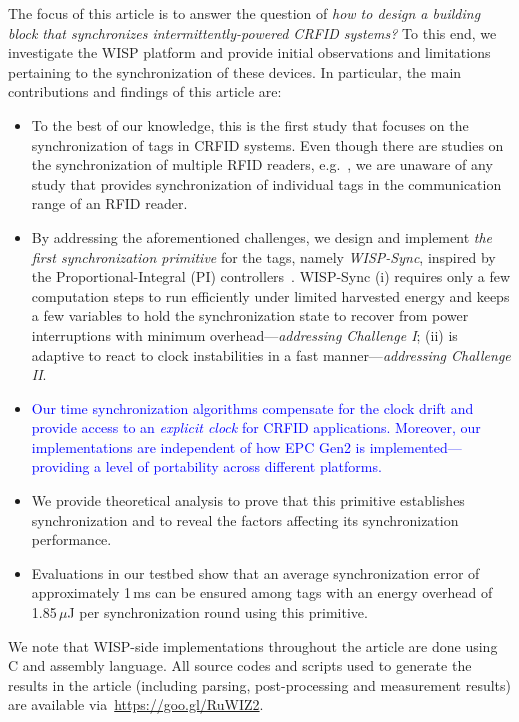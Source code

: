 \documentclass[10pt,journal,compsoc]{IEEEtran}
\newcommand{\add}[1]{\textcolor{blue}{#1}}
\begin{document}
The focus of this article is to answer the question of \emph{how to design a building block that synchronizes intermittently-powered CRFID systems?} To this end, we investigate the WISP platform and provide initial observations and limitations pertaining to the synchronization of these devices. In particular, the main contributions and findings of 
this article are:
%
\begin{itemize}
	\item To the best of our knowledge, this is the first study that focuses on the synchronization of tags in CRFID systems. Even though there are studies on the synchronization of multiple RFID readers, e.g.~\cite{reader_sync}, we are unaware of any study that provides synchronization of individual tags in the communication range of an RFID reader. 
	\item By addressing the aforementioned challenges, we design and implement \emph{the first synchronization primitive} for the tags, namely \emph{WISP-Sync}, inspired by the Proportional-Integral (PI) controllers~\cite{pi2015,yildirim2017adaptive}. WISP-Sync (i) 
	requires only a few computation steps to run efficiently under limited harvested energy and keeps a few variables to hold the synchronization state to recover from power interruptions with minimum overhead---\emph{addressing Challenge I}; (ii) is adaptive to react to clock instabilities in a fast manner---\emph{addressing Challenge II}.
	\item \add{Our time synchronization algorithms compensate for the clock drift and provide access to an \emph{explicit clock} for CRFID applications. Moreover, our implementations are independent of how EPC Gen2 is implemented---providing a level of portability across different platforms.}
	\item We provide theoretical analysis to prove that this primitive establishes synchronization and to reveal the factors affecting its synchronization performance.
	\item Evaluations in our testbed show that an average synchronization error of approximately 1\,ms can be ensured among tags with an energy overhead of 1.85\,$\mu$J per synchronization round using this  primitive.
\end{itemize}
%
We note that WISP-side implementations throughout the article are done using C and assembly language. All source codes and scripts used to generate the results in the article (including parsing, post-processing and measurement results) are available via~\href{https://goo.gl/RuWIZ2}{https://goo.gl/RuWIZ2}.
\end{document}
